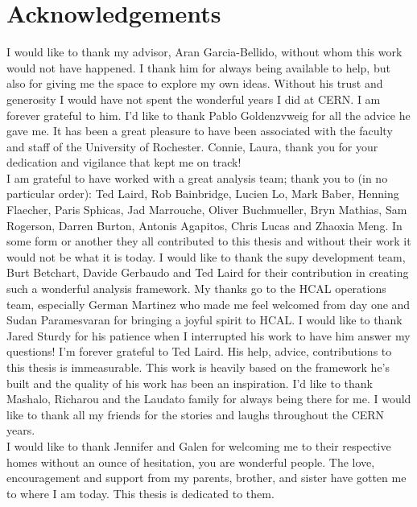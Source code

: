 \clearpage
\section*{Acknowledgements}

\indent I would like to thank my advisor, Aran Garcia-Bellido, without whom this work would not have happened. 
I thank him for always being available to help, but also for giving me the space to explore my own ideas. 
Without his trust and generosity I would have not spent the wonderful years I did at CERN. I am forever 
grateful to him. I'd like to thank Pablo Goldenzvweig for all the advice he gave me. It has been a great 
pleasure to have been associated with the faculty and staff of the University of Rochester. Connie, Laura, 
thank you for your dedication and vigilance that kept me on track! \\
\indent I am grateful to have worked with a great analysis team; thank you to (in no particular order): Ted Laird, 
Rob Bainbridge, Lucien Lo, Mark Baber, Henning Flaecher, Paris Sphicas, Jad Marrouche, Oliver Buchmueller, 
Bryn Mathias, Sam Rogerson, Darren Burton, Antonis Agapitos, Chris Lucas and Zhaoxia Meng. In some form or 
another they all contributed to this thesis and without their work it would not be what it is today. 
I would like to thank the supy development team, Burt Betchart, Davide Gerbaudo and Ted Laird for their contribution 
in creating such a wonderful analysis framework. My thanks go to the HCAL operations team, especially German 
Martinez who made me feel welcomed from day one and Sudan Paramesvaran for bringing a joyful spirit to HCAL.
I would like to thank Jared Sturdy for his patience when I interrupted his work to have him answer my questions! 
I'm forever grateful to Ted Laird. His help, advice, contributions to this thesis is immeasurable. This work is
heavily based on the framework he's built and the quality of his work has been an inspiration. I'd like to thank 
Mashalo, Richarou and the Laudato family for always being there for me. I would like to thank all my friends for 
the stories and laughs throughout the CERN years. \\
\indent I would like to thank Jennifer and Galen for welcoming me to their respective homes without
an ounce of hesitation, you are wonderful people. 
The love, encouragement and support from my parents, brother, and sister have gotten me to where I am today.
This thesis is dedicated to them. 
